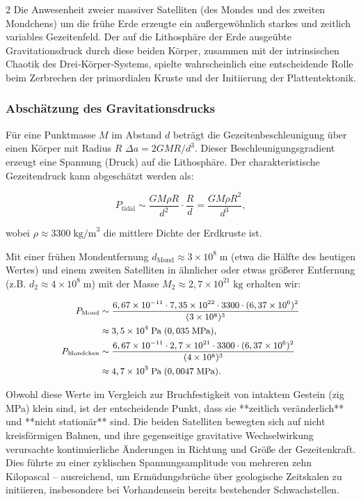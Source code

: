 \documentclass[11pt,a4paper]{article}
\begin{document}
\begin{multicols}{2}
		Die Anwesenheit zweier massiver Satelliten (des Mondes und des zweiten Mondchens) um die frühe Erde erzeugte ein außergewöhnlich starkes und zeitlich variables Gezeitenfeld. Der auf die Lithosphäre der Erde ausgeübte Gravitationsdruck durch diese beiden Körper, zusammen mit der intrinsischen Chaotik des Drei‑Körper‑Systems, spielte wahrscheinlich eine entscheidende Rolle beim Zerbrechen der primordialen Kruste und der Initiierung der Plattentektonik.
		
		\subsubsection{Abschätzung des Gravitationsdrucks}
		
		Für eine Punktmasse \(M\) im Abstand \(d\) beträgt die Gezeitenbeschleunigung über einen Körper mit Radius \(R\) \(\Delta a = 2GM R / d^{3}\). Dieser Beschleunigungsgradient erzeugt eine Spannung (Druck) auf die Lithosphäre. Der charakteristische Gezeitendruck kann abgeschätzt werden als:
		
		\[
		P_{\text{tidal}} \sim \frac{GM \rho R}{d^{2}} \cdot \frac{R}{d} = \frac{GM \rho R^{2}}{d^{3}},
		\]
		
		wobei \(\rho \approx 3300\;\text{kg/m}^{3}\) die mittlere Dichte der Erdkruste ist.
		
		Mit einer frühen Mondentfernung \(d_{\text{Mond}} \approx 3\times10^{8}\;\text{m}\) (etwa die Hälfte des heutigen Wertes) und einem zweiten Satelliten in ähnlicher oder etwas größerer Entfernung (z.B. \(d_{2} \approx 4\times10^{8}\;\text{m}\)) mit der Masse \(M_{2} \approx 2,7\times10^{21}\;\text{kg}\) erhalten wir:
		
		\[
	\small
		\begin{aligned}
			P_{\text{Mond}} &\sim \frac{6,67\times10^{-11} \cdot 7,35\times10^{22} \cdot 3300 \cdot (6,37\times10^{6})^{2}}{(3\times10^{8})^{3}} \\
			&\approx 3,5 \times 10^{4}\;\text{Pa} \;(0,035\;\text{MPa}),\\
			P_{\text{Mondchen}} &\sim \frac{6,67\times10^{-11} \cdot 2,7\times10^{21} \cdot 3300 \cdot (6,37\times10^{6})^{2}}{(4\times10^{8})^{3}} \\
			&\approx 4,7 \times 10^{3}\;\text{Pa} \;(0,0047\;\text{MPa}).
		\end{aligned}
		\]
		
		Obwohl diese Werte im Vergleich zur Bruchfestigkeit von intaktem Gestein (zig MPa) klein sind, ist der entscheidende Punkt, dass sie **zeitlich veränderlich** und **nicht stationär** sind. Die beiden Satelliten bewegten sich auf nicht kreisförmigen Bahnen, und ihre gegenseitige gravitative Wechselwirkung verursachte kontinuierliche Änderungen in Richtung und Größe der Gezeitenkraft. Dies führte zu einer zyklischen Spannungsamplitude von mehreren zehn Kilopascal – ausreichend, um Ermüdungsbrüche über geologische Zeitskalen zu initiieren, insbesondere bei Vorhandensein bereits bestehender Schwachstellen.
		

\end{multicols}
\end{document}
